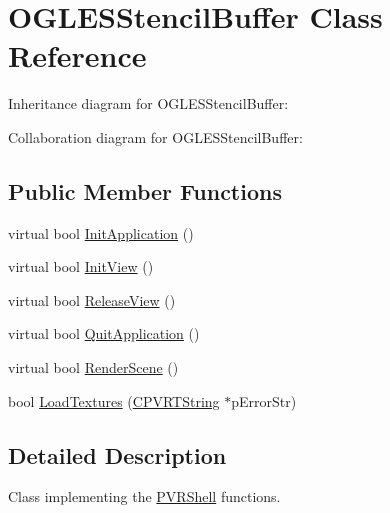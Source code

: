 \hypertarget{class_o_g_l_e_s_stencil_buffer}{\section{O\+G\+L\+E\+S\+Stencil\+Buffer Class Reference}
\label{class_o_g_l_e_s_stencil_buffer}
}


Inheritance diagram for O\+G\+L\+E\+S\+Stencil\+Buffer\+:


Collaboration diagram for O\+G\+L\+E\+S\+Stencil\+Buffer\+:
\subsection*{Public Member Functions}
\begin{DoxyCompactItemize}
\item 
virtual bool \hyperlink{class_o_g_l_e_s_stencil_buffer_a3d84c3667a0dc40a3edf1bcedc9075d9}{Init\+Application} ()
\item 
virtual bool \hyperlink{class_o_g_l_e_s_stencil_buffer_a5c3122422d271f4a9e4ac523d4a577ba}{Init\+View} ()
\item 
virtual bool \hyperlink{class_o_g_l_e_s_stencil_buffer_a0d28833f8f4908844b7838320e00ca05}{Release\+View} ()
\item 
virtual bool \hyperlink{class_o_g_l_e_s_stencil_buffer_abbdf263053356672e25f2077add210a1}{Quit\+Application} ()
\item 
virtual bool \hyperlink{class_o_g_l_e_s_stencil_buffer_a54c8399b5a2e2fab387927a3acb5ca6d}{Render\+Scene} ()
\item 
bool \hyperlink{class_o_g_l_e_s_stencil_buffer_aa7e49d717cee5703a894cc7f1faccd14}{Load\+Textures} (\hyperlink{class_c_p_v_r_t_string}{C\+P\+V\+R\+T\+String} $\ast$p\+Error\+Str)
\end{DoxyCompactItemize}


\subsection{Detailed Description}


 Class implementing the \hyperlink{class_p_v_r_shell}{P\+V\+R\+Shell} functions. 

